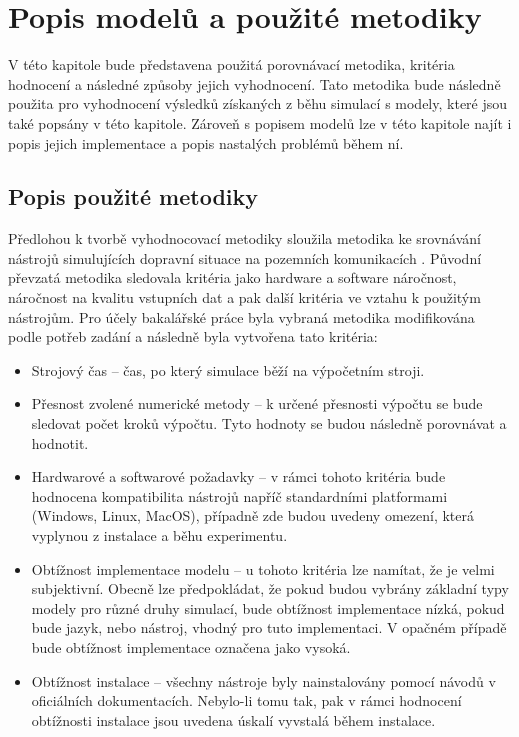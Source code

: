 
\chapter{Popis modelů a použité metodiky}
\label{kapitola4}
V této kapitole bude představena použitá porovnávací metodika, kritéria hodnocení a následné způsoby jejich vyhodnocení. Tato metodika bude následně použita pro vyhodnocení výsledků získaných z běhu simulací s modely, které jsou také popsány v této kapitole. Zároveň s popisem modelů lze v této kapitole najít i popis jejich implementace a popis nastalých problémů během ní.

\section{Popis použité metodiky}

Předlohou k tvorbě vyhodnocovací metodiky sloužila metodika ke srovnávání nástrojů simulujících dopravní situace na pozemních komunikacích \cite{jones2004traffic}. Původní převzatá metodika sledovala kritéria jako hardware a software náročnost, náročnost na kvalitu vstupních dat a pak další kritéria ve vztahu k použitým nástrojům. Pro účely bakalářské práce byla vybraná metodika modifikována podle potřeb zadání a následně byla vytvořena tato kritéria:
\begin{itemize}
    \item Strojový čas -- čas, po který simulace běží na výpočetním stroji.
    \item Přesnost zvolené numerické metody -- k určené přesnosti výpočtu se bude sledovat počet kroků výpočtu. Tyto hodnoty se budou následně porovnávat a hodnotit.
    \item Hardwarové a softwarové požadavky -- v rámci tohoto kritéria bude hodnocena kompatibilita nástrojů napříč standardními platformami (Windows, Linux, MacOS), případně zde budou uvedeny omezení, která vyplynou z instalace a běhu experimentu.
    \item Obtížnost implementace modelu -- u tohoto kritéria lze namítat, že je velmi subjektivní. Obecně lze předpokládat, že pokud budou vybrány základní typy modely pro různé druhy simulací, bude obtížnost implementace nízká, pokud bude jazyk, nebo nástroj, vhodný pro tuto implementaci. V opačném případě bude obtížnost implementace označena jako vysoká.
    \item Obtížnost instalace -- všechny nástroje byly nainstalovány pomocí návodů v oficiálních dokumentacích. Nebylo-li tomu tak, pak v rámci hodnocení obtížnosti instalace jsou uvedena úskalí vyvstalá během instalace.
\end{itemize}

